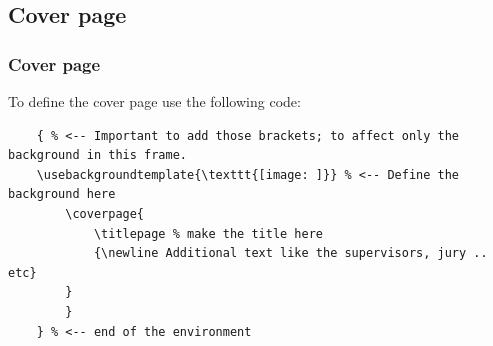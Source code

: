 \documentclass{EESD}
\begin{document}
\subsection{Cover page}
\begin{frame}[fragile]
\frametitle{Cover page}
    To define the cover page use the following code:
    \vspace{10pt}
    \begin{lstlisting}
    { % <-- Important to add those brackets; to affect only the background in this frame.
    \usebackgroundtemplate{\texttt{[image: ]}} % <-- Define the background here
        \coverpage{
            \titlepage % make the title here
            {\newline Additional text like the supervisors, jury .. etc}
        }
        }
    } % <-- end of the environment
    \end{lstlisting}
    \vspace{10pt}
\end{frame}
\end{document}
